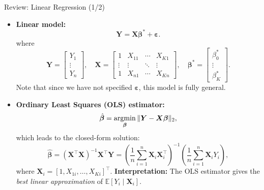 \documentclass[10pt, handout]{beamer}
\theoremstyle{plain}
\newcommand{\argmin}{\operatornamewithlimits{argmin}}
\newcommand{\bX}{\bm{X}}
\newcommand{\bY}{\bm{Y}}
\newcommand{\E}{\mathbb{E}}
\begin{document}
\begin{frame}{Review: Linear Regression (1/2)}
\small
\begin{itemize}
  \item \textbf{Linear model:}
  \[
    \bY = \bX \bm{\beta}^\ast + \bm{\varepsilon}.
  \]
  where
  \[
  \bY =
  \begin{bmatrix}
  Y_1 \\ \vdots \\ Y_n
  \end{bmatrix}, \quad
  \bX =
  \begin{bmatrix}
  1 & X_{11} & \cdots & X_{K1} \\
  \vdots & \vdots & \ddots & \vdots \\
  1 & X_{n1} & \cdots & X_{Kn}
  \end{bmatrix}, \quad
  \bm{\beta}^\ast =
  \begin{bmatrix}
  \beta^\ast_0 \\ \vdots \\ \beta^\ast_K
  \end{bmatrix}.
  \]
  \pause
  \vspace{0.5em}
  Note that since we have not specified $\bm{\varepsilon}$, this model is fully general.
  \pause
  \vspace{1em}

  \item \textbf{Ordinary Least Squares (OLS) estimator:}
  \[
    \hat{\bm{\beta}} = \argmin_{\bm{\beta}} \|\bY - \bX \bm{\beta}\|_2,
  \]
  which leads to the closed-form solution:
  \[
    \hat{\bm{\beta}} = (\bX^\top \bX)^{-1} \bX^\top \bY
    = \left(\frac{1}{n}\sum_{i=1}^n \bX_i \bX_i^\top\right)^{-1}
      \left(\frac{1}{n}\sum_{i=1}^n \bX_i Y_i\right),
  \]
  where $\bX_i = [1, X_{1i}, \ldots, X_{Ki}]^\top$.
  \pause
  \vspace{0.5em}
  \textbf{Interpretation:} The OLS estimator gives the \emph{best linear approximation} of $\E[Y_i \mid \bX_i]$.
\end{itemize}
\end{frame}
\end{document}
